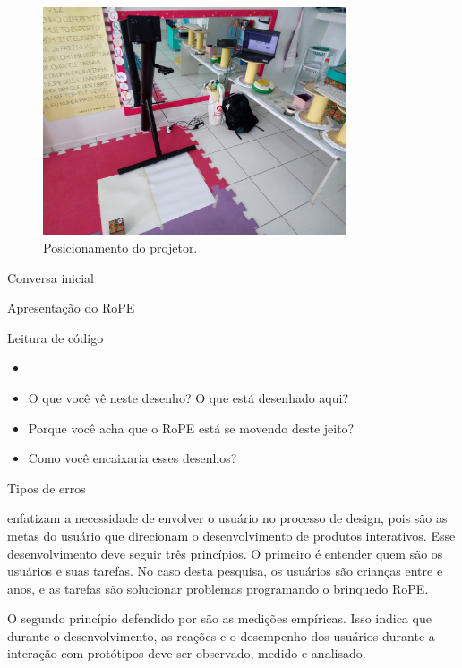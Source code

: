 \begin{figure}[!h]
    \centering
    \includegraphics[width=0.8\textwidth,fbox]{figs/setting_projector.jpg}
    \caption{Posicionamento do projetor.}
    \label{fig:setting}
\end{figure}

\label{sec:protocolo}
Conversa inicial

Apresentação do RoPE

Leitura de código
\begin{itemize}
\item 
\item O que você vê neste desenho? O que está desenhado aqui?
\item Porque você acha que o RoPE está se movendo deste jeito?
\item Como você encaixaria esses desenhos?
\end{itemize}

Tipos de erros



 enfatizam a necessidade de envolver o usuário no processo de design, pois são as metas do usuário que direcionam o desenvolvimento de produtos interativos. Esse desenvolvimento deve seguir três princípios. O primeiro é entender quem são os usuários e suas tarefas. No caso desta pesquisa, os usuários são crianças entre \idadeinicial e \idadefinal anos, e as tarefas são solucionar problemas programando o brinquedo RoPE. 

O segundo princípio defendido por  são as medições empíricas. Isso indica que durante o desenvolvimento, as reações e o desempenho dos usuários durante a interação com protótipos deve ser observado, medido e analisado. 

